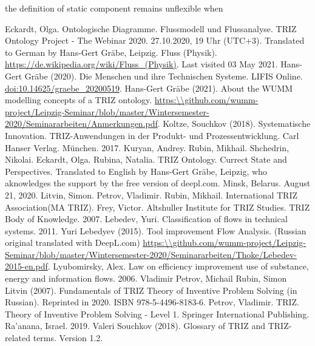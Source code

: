 \documentclass[a4paper,11pt]{article}
\begin{document}
\begin{itemize}
        the definition of static component remains unflexible when 

\begin{thebibliography}{...}
    \raggedright
     Eckardt, Olga. Ontologische Diagramme. Flussmodell und Flussanalyse. TRIZ Ontology Project - The Webinar 2020. 27.10.2020, 19 Uhr (UTC+3). Translated to German by Hans-Gert Gräbe, Leipzig. 
     Fluss (Physik).
        \url{https://de.wikipedia.org/wiki/Fluss_(Physik)}. Last visited 03 May 2021.
     Hans-Gert Gräbe (2020).  Die Menschen und ihre Technischen Systeme. LIFIS Online.
        \url{doi:10.14625/graebe_20200519}.
     Hans-Gert Gr\"abe (2021). About the WUMM modelling concepts of a TRIZ ontology.
        \url{https:\\github.com/wumm-project/Leipzig-Seminar/blob/master/Wintersemester-2020/Seminararbeiten/Anmerkungen.pdf}.
     Koltze, Souchkov (2018). Systematische Innovation. TRIZ-Anwendungen in der Produkt- und Prozessentwicklung. Carl Hanser Verlag. München. 2017.
     Kuryan, Andrey. Rubin, Mikhail. Shchedrin, Nikolai. Eckardt, Olga. Rubina, Natalia. TRIZ Ontology. Currect State and Perspectives. Translated to English by Hans-Gert Gräbe, Leipzig, who aknowledges the support by the free version of deepl.com. Minsk, Belarus. August 21, 2020.
     Litvin, Simon. Petrov, Vladimir. Rubin, Mikhail. International TRIZ Association(MA TRIZ). Frey, Victor. Altshuller Institute for TRIZ Studies. TRIZ Body of Knowledge. 2007.
     Lebedev, Yuri. Classification of flows in technical systems. 2011.
     Yuri Lebedyev (2015). Tool improvement Flow Analysis. (Russian original translated with DeepL.com)
      \url{https:\\github.com/wumm-project/Leipzig-Seminar/blob/master/Wintersemester-2020/Seminararbeiten/Thoke/Lebedev-2015-en.pdf}.
     Lyubomirsky, Alex. Law on efficiency improvement use of substance, energy and information flows. 2006.
     Vladimir Petrov, Michail Rubin, Simon Litvin (2007). Fundamentals of TRIZ Theory of Inventive Problem Solving (in Russian). Reprinted in 2020. ISBN 978-5-4496-8183-6.
     Petrov, Vladimir. TRIZ. Theory of Inventive Problem Solving - Level 1. Springer International Publishing. Ra'anana, Israel. 2019.
     Valeri Souchkov (2018).  Glossary of TRIZ and TRIZ-related terms. Version 1.2.

\end{thebibliography}
\end{itemize}
\end{document}
